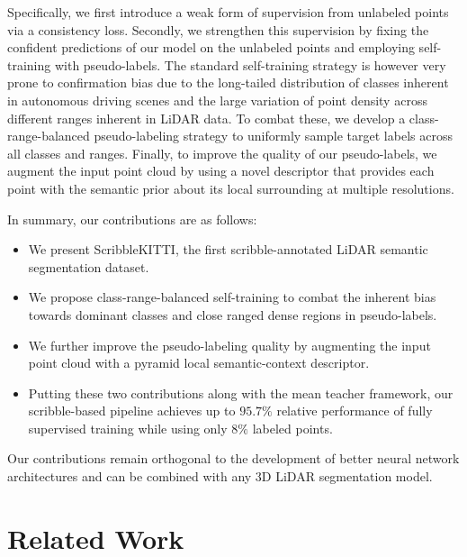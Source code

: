\documentclass[10pt,twocolumn,letterpaper]{article}
\begin{document}
Specifically, we first introduce a weak form of supervision from unlabeled points via a consistency loss. Secondly, we strengthen this supervision by fixing the confident predictions of our model on the unlabeled points and employing self-training with pseudo-labels. The standard self-training strategy is however very prone to confirmation bias due to the long-tailed distribution of classes inherent in autonomous driving scenes and the large variation of point density across different ranges inherent in LiDAR data. To combat these, we develop a class-range-balanced pseudo-labeling strategy to uniformly sample target labels across all classes and ranges. Finally, to improve the quality of our pseudo-labels, we augment the input point cloud by using a novel descriptor that provides each point with the semantic prior about its local surrounding at multiple resolutions.

\noindent In summary, our contributions are as follows:
\begin{itemize}[noitemsep]
    \item We present ScribbleKITTI, the first scribble-annotated LiDAR semantic segmentation dataset.
    \item We propose class-range-balanced self-training to combat the inherent bias towards dominant classes and close ranged dense regions in pseudo-labels.
    \item We further improve the pseudo-labeling quality by augmenting the input point cloud with a pyramid local semantic-context descriptor.
    \item Putting these two contributions along with the mean teacher framework, our scribble-based pipeline achieves up to $95.7\%$ relative performance of fully supervised training while using only $8\%$ labeled points. 
 \end{itemize}
Our contributions remain orthogonal to the development of better neural network architectures and can be combined with any 3D LiDAR segmentation model.

\section{Related Work}
\end{document}
